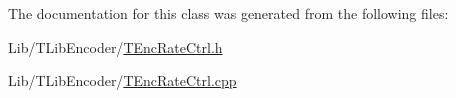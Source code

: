 The documentation for this class was generated from the following files\+:\begin{DoxyCompactItemize}
\item 
Lib/\+T\+Lib\+Encoder/\hyperlink{_t_enc_rate_ctrl_8h}{T\+Enc\+Rate\+Ctrl.\+h}\item 
Lib/\+T\+Lib\+Encoder/\hyperlink{_t_enc_rate_ctrl_8cpp}{T\+Enc\+Rate\+Ctrl.\+cpp}\end{DoxyCompactItemize}
